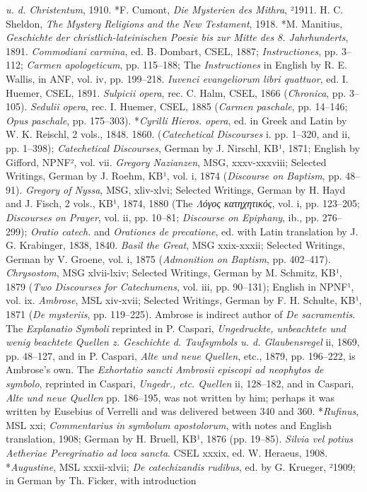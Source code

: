 \emph{u. d. Christentum}, 1910. *F. Cumont, \emph{Die Mysterien des Mithra}, ²1911. H. C. Sheldon, \emph{The Mystery Religions and the New Testament}, 1918. *M. Manitius, \emph{Geschichte der christlich-lateinischen Poesie bis zur Mitte des 8. Jahrhunderts}, 1891. \emph{Commodiani carmina}, ed. B. Dombart, CSEL, 1887; \emph{Instructiones}, pp. 3–112; \emph{Carmen apologeticum}, pp. 115–188; The \emph{Instructiones} in English by R. E. Wallis, in ANF, vol. iv, pp. 199–218. \emph{Iuvenci evangeliorum libri quattuor}, ed. I. Huemer, CSEL, 1891. \emph{Sulpicii opera}, rec. C. Halm, CSEL, 1866 (\emph{Chronica}, pp. 3–105). \emph{Sedulii opera}, rec. I. Huemer, CSEL, 1885 (\emph{Carmen paschale}, pp. 14–146; \emph{Opus paschale}, pp. 175–303). *\emph{Cyrilli Hieros. opera}, ed. in Greek and Latin by W. K. Reischl, 2 vols., 1848. 1860. (\emph{Catechetical Discourses} i. pp. 1–320, and ii, pp. 1–398); \emph{Catechetical Discourses}, German by J. Nirschl, KB¹, 1871; English by Gifford, NPNF², vol. vii. \emph{Gregory Nazianzen}, MSG, xxxv-xxxviii; Selected Writings, German by J. Roehm, KB¹, vol. i, 1874 (\emph{Discourse on Baptism}, pp. 48–91). \emph{Gregory of Nyssa}, MSG, xliv-xlvi; Selected Writings, German by H. Hayd and J. Fisch, 2 vols., KB¹, 1874, 1880 (The \emph{Λόγος κατηχητικός}, vol. i, pp. 123–205; \emph{Discourses on Prayer}, vol. ii, pp. 10–81; \emph{Discourse on Epiphany}, ib., pp. 276–299); \emph{Oratio catech.} and \emph{Orationes de precatione}, ed. with Latin translation by J. G. Krabinger, 1838, 1840. \emph{Basil the Great}, MSG xxix-xxxii; Selected Writings, German by V. Groene, vol. i, 1875 (\emph{Admonition on Baptism}, pp. 402–417). \emph{Chrysostom}, MSG xlvii-lxiv; Selected Writings, German by M. Schmitz, KB¹, 1879 (\emph{Two Discourses for Catechumens}, vol. iii, pp. 90–131); English in NPNF¹, vol. ix. \emph{Ambrose}, MSL xiv-xvii; Selected Writings, German by F. H. Schulte, KB¹, 1871 (\emph{De mysteriis}, pp. 119–225). Ambrose is indirect author of \emph{De sacramentis}. The \emph{Explanatio Symboli} reprinted in P. Caspari, \emph{Ungedruckte, unbeachtete und wenig beachtete Quellen z. Geschichte d. Taufsymbols u. d. Glaubensregel} ii, 1869, pp. 48–127, and in P. Caspari, \emph{Alte und neue Quellen}, etc., 1879, pp. 196–222, is Ambrose’s own. The \emph{Exhortatio sancti Ambrosii episcopi ad neophytos de symbolo}, reprinted in Caspari, \emph{Ungedr., etc. Quellen} ii, 128–182, and in Caspari, \emph{Alte und neue Quellen} pp. 186–195, was not written by him; perhaps it was written by Eusebius of Verrelli and was delivered between 340 and 360. *\emph{Rufinus}, MSL xxi; \emph{Commentarius in symbolum apostolorum}, with notes and English translation, 1908; German by H. Bruell, KB¹, 1876 (pp. 19–85). \emph{Silvia vel potius Aetheriae Peregrinatio ad loca sancta}. CSEL xxxix, ed. W. Heraeus, 1908. *\emph{Augustine}, MSL xxxii-xlvii; \emph{De catechizandis rudibus}, ed. by G. Krueger, ²1909; in German by Th. Ficker, with introduction
